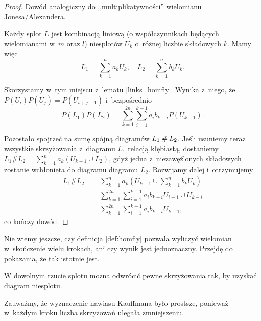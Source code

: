 \begin{proof}
    Dowód analogiczny do ,,multiplikatywności'' wielomianu Jonesa/Alexandera.

    Każdy splot $L$ jest kombinacją liniową (o współczynnikach będących wielomianami w~$m$ oraz $l$) niesplotów $U_k$ o~różnej liczbie składowych $k$.
    Mamy więc
    \begin{equation}
        L_1 = \sum_{k=1}^n a_k U_k, \quad
        L_2 = \sum_{k=1}^n b_k U_k.
    \end{equation}

    Skorzystamy w~tym miejscu z~lematu \ref{links_homfly}.
    Wynika z~niego, że $P(U_i)P(U_j) = P(U_{i+j-1})$ i~bezpośrednio
    \begin{equation}
        P(L_1)P(L_2) = \sum_{k=1}^{2n} \sum_{i=1}^{k-1} a_i b_{k-i}P(U_{k-1}).
    \end{equation}

    Pozostało spojrzeć na sumę spójną diagramów  $L_1 \mathbin{\#} L_2$.
    Jeśli usuniemy teraz wszystkie skrzyżowania z~diagramu $L_1$ relacją kłębiastą, dostaniemy $L_1 \# L_2 = \sum_{k=1}^n a_k (U_{k-1} \cup L_2)$, gdyż jedna z~niezawęźlonych składowych zostanie wchłonięta do diagramu diagramu $L_2$.
    Rozwijamy dalej i~otrzymujemy
    \begin{align}
        L_1 \# L_2
        & = \sum_{k=1}^n a_k \left(U_{k-1} \cup \sum_{k=1}^n b_k U_k\right) \\
        & = \sum_{k=1}^{2n} \sum_{i=1}^{k-1} a_i b_{k-i} U_{i-1} \cup U_{k-i} \\
        & = \sum_{k=1}^{2n} \sum_{i=1}^{k-1} a_i b_{k-i} U_{k-1},
    \end{align}
    co kończy dowód.
\end{proof}

Nie wiemy jeszcze, czy definicja \ref{def:homfly} pozwala wyliczyć wielomian w~skończenie wielu krokach, ani czy wynik jest jednoznaczny.
Przejdę do pokazania, że tak istotnie jest.


\begin{lemma}
    W dowolnym rzucie splotu można odwrócić pewne skrzyżowania tak, by uzyskać diagram niesplotu.
\end{lemma}

Zauważmy, że wyznaczenie nawiasu Kauffmana było prostsze, ponieważ w~każdym kroku liczba skrzyżowań ulegała zmniejszeniu.

